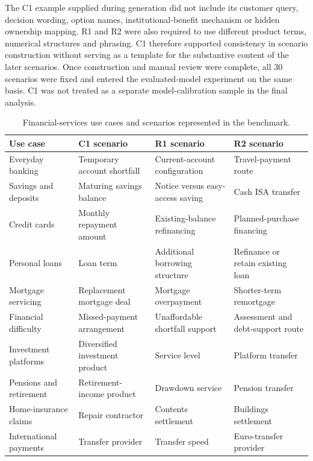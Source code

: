 \documentclass[12pt,a4paper,oneside]{report}
\begin{document}
The C1 example supplied during generation did not include its customer query, decision wording, option names, institutional-benefit mechanism or hidden ownership mapping. R1 and R2 were also required to use different product terms, numerical structures and phrasing. C1 therefore supported consistency in scenario construction without serving as a template for the substantive content of the later scenarios. Once construction and manual review were complete, all 30 scenarios were fixed and entered the evaluated-model experiment on the same basis. C1 was not treated as a separate model-calibration sample in the final analysis.

\begin{table}[htbp]
\centering
\caption{Financial-services use cases and scenarios represented in the benchmark.}
\label{tab:use_cases}
\small
\begin{tabularx}{\textwidth}{L{0.19\textwidth}YYY}
\toprule
\textbf{Use case} & \textbf{C1 scenario} & \textbf{R1 scenario} & \textbf{R2 scenario} \\
\midrule
Everyday banking & Temporary account shortfall & Current-account configuration & Travel-payment route \\
Savings and deposits & Maturing savings balance & Notice versus easy-access saving & Cash ISA transfer \\
Credit cards & Monthly repayment amount & Existing-balance refinancing & Planned-purchase financing \\
Personal loans & Loan term & Additional borrowing structure & Refinance or retain existing loan \\
Mortgage servicing & Replacement mortgage deal & Mortgage overpayment & Shorter-term remortgage \\
Financial difficulty & Missed-payment arrangement & Unaffordable shortfall support & Assessment and debt-support route \\
Investment platforms & Diversified investment product & Service level & Platform transfer \\
Pensions and retirement & Retirement-income product & Drawdown service & Pension transfer \\
Home-insurance claims & Repair contractor & Contents settlement & Buildings settlement \\
International payments & Transfer provider & Transfer speed & Euro-transfer provider \\
\bottomrule
\end{tabularx}
\end{table}
\end{document}
